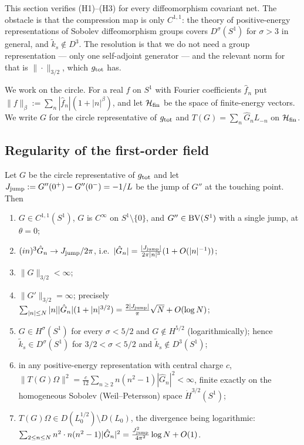 This section verifies (H1)--(H3) for every diffeomorphism covariant net.  The obstacle is that the
compression map is only $C^{1,1}$: the theory of positive-energy representations of Sobolev diffeomorphism
groups \cite{CDIT} covers $D^{\sigma}(S^{1})$ for $\sigma>3$ in general, and $\tilde k_{s}\notin D^{3}$.
The resolution is that we do not need a group representation --- only one self-adjoint generator --- and
the relevant norm for that is $\|\cdot\|_{3/2}$, which $g_{\rm tot}$ has.

We work on the circle.  For a real $f$ on $S^{1}$ with Fourier coefficients $\hat f_{n}$ put
$\|f\|_{\beta}:=\sum_{n}|\hat f_{n}|(1+|n|^{\beta})$, and let $\mathcal H_{\rm fin}$ be the space of finite-energy
vectors.  We write $G$ for the circle representative of $g_{\rm tot}$ and
$T(G)=\sum_{n}\hat G_{n}L_{-n}$ on $\mathcal H_{\rm fin}$.

\subsection{Regularity of the first-order field}

\begin{theorem}[regularity]\label{thm:reg}
Let $G$ be the circle representative of $g_{\rm tot}$ and let $J_{\rm jump}:=G''(0^{+})-G''(0^{-})=-1/L$ be
the jump of $G''$ at the touching point.  Then
\begin{enumerate}[label=\textup{(\alph*)},leftmargin=2.4em]
\item $G\in C^{1,1}(S^{1})$, $G$ is $C^{\infty}$ on $S^{1}\setminus\{0\}$, and $G''\in\mathrm{BV}(S^{1})$ with a
 single jump, at $\theta=0$;
\item $(in)^{3}\hat G_{n}\to J_{\rm jump}/2\pi$, i.e.\
 $|\hat G_{n}|=\frac{|J_{\rm jump}|}{2\pi|n|^{3}}(1+O(|n|^{-1}))$;
\item $\|G\|_{3/2}<\infty$;
\item $\|G'\|_{3/2}=\infty$; precisely
 $\sum_{|n|\le N}|n||\hat G_{n}|(1+|n|^{3/2})=\frac{2|J_{\rm jump}|}{\pi}\sqrt N+O(\log N)$;
\item $G\in H^{\sigma}(S^{1})$ for every $\sigma<5/2$ and $G\notin H^{5/2}$ (logarithmically); hence
 $\tilde k_{s}\in D^{\sigma}(S^{1})$ for $3/2<\sigma<5/2$ and $\tilde k_{s}\notin D^{3}(S^{1})$;
\item in any positive-energy representation with central charge $c$,
 $\|T(G)\Omega\|^{2}=\frac{c}{12}\sum_{n\ge2}n(n^{2}-1)|\hat G_{n}|^{2}<\infty$, finite exactly on the
 homogeneous Sobolev (Weil--Petersson) space $\dot H^{3/2}(S^{1})$;
\item $T(G)\Omega\in D(L_{0}^{1/2})\setminus D(L_{0})$, the divergence being logarithmic:
 $\sum_{2\le n\le N}n^{2}\cdot n(n^{2}-1)|\hat G_{n}|^{2}=\frac{J_{\rm jump}^{2}}{4\pi^{2}}\log N+O(1)$.
\end{enumerate}
\end{theorem}

